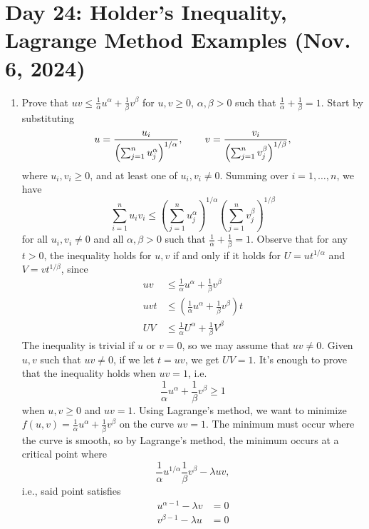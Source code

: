 \section{Day 24: Holder's Inequality, Lagrange Method Examples (Nov. 6, 2024)}
\begin{enumerate}[label=(\alph*)]
    \item Prove that $uv \leq \frac{1}{\alpha}u^\alpha + \frac{1}{\beta} v^\beta$ for $u, v \geq 0$, $\alpha, \beta > 0$ such that $\frac{1}{\alpha} + \frac{1}{\beta} = 1$.
    \medskip\newline
    Start by substituting
    \[ u = \frac{u_i}{\left(\sum_{j=1}^n u_j^\alpha \right)^{1/\alpha}}, \hspace{0.3in} v = \frac{v_i}{\left(\sum_{j=1}^n v_j^\beta \right)^{1/\beta}}, \]
    where $u_i, v_i \geq 0$, and at least one of $u_i, v_i \neq 0$. Summing over $i = 1, \dots, n$, we have
    \[ \sum_{i=1}^n u_iv_i \leq \left(\sum_{j=1}^n u_j^\alpha\right)^{1/\alpha} \left(\sum_{j=1}^n v_j^\beta\right)^{1/\beta} \]
    for all $u_i, v_i \neq 0$ and all $\alpha, \beta > 0$ such that $\frac{1}{\alpha} + \frac{1}{\beta} = 1$. Observe that for any $t > 0$, the inequality holds for $u, v$ if and only if it holds for $U = ut^{1/\alpha}$ and $V = vt^{1/\beta}$, since
    \begin{align*}
        uv &\leq \frac{1}{\alpha} u^\alpha + \frac{1}{\beta} v^\beta \\
        uvt &\leq \left( \frac{1}{\alpha} u^\alpha + \frac{1}{\beta} v^\beta \right) t \\
        UV &\leq \frac{1}{\alpha} U^\alpha + \frac{1}{\beta} V^\beta
    \end{align*}
    The inequality is trivial if $u$ or $v = 0$, so we may assume that $uv \neq 0$. Given $u, v$ such that $uv \neq 0$, if we let $t = uv$, we get $UV = 1$. It's enough to prove that the inequality holds when $uv = 1$, i.e.
    \[ \frac{1}{\alpha} u^\alpha + \frac{1}{\beta} v^\beta \geq 1 \]
    when $u, v \geq 0$ and $uv = 1$. Using Lagrange's method, we want to minimize $f(u, v) = \frac{1}{\alpha} u^\alpha + \frac{1}{\beta} v^\beta$ on the curve $uv = 1$. The minimum must occur where the curve is smooth, so by Lagrange's method, the minimum occurs at a critical point where
    \[ \frac{1}{\alpha} u^{1/\alpha} \frac{1}{\beta} v^\beta - \lambda u v, \]
    i.e., said point satisfies
    \begin{align*}
        u^{\alpha - 1} - \lambda v &= 0 \\
        v^{\beta - 1} - \lambda u &= 0 \\

\end{align*}
\end{enumerate}
